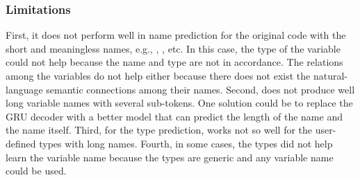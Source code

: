 \subsubsection{Limitations}
\label{sec:limitations}

First, it does not perform well in name prediction for the original
code with the short and meaningless names, e.g., , ,
etc. In this case, the type of the variable could not help because the
name and type are not in accordance. The relations among the variables
do not help either because there does not exist the natural-language
semantic connections among their names. Second, {\tool} does not
produce well long variable names with several sub-tokens. One solution
could be to replace the GRU decoder with a better model that can
predict the length of the name and the name itself. Third, for the
type prediction, {\tool} works not so well for the user-defined types
with long names. Fourth, in some cases, the types did not
help learn the variable name because the types are generic and
any variable name could be used.

{\color{blue}{Yi: we could find two examples: 1) original names are
meaningless, e.g., i, j. etc; 2) the long names with multiple
subtokens.}}
